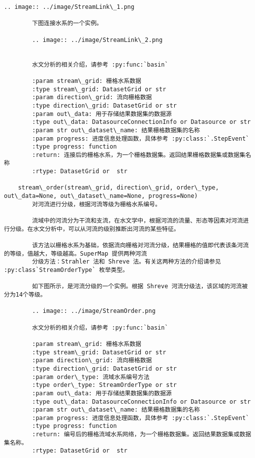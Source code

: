 \documentclass[11pt]{article}
\begin{document}
\begin{Verbatim}[commandchars=\\\{\}]
        .. image:: ../image/StreamLink\_1.png
        
        下图连接水系的一个实例。
        
        .. image:: ../image/StreamLink\_2.png
        
        
        水文分析的相关介绍，请参考 :py:func:`basin`
        
        :param stream\_grid: 栅格水系数据
        :type stream\_grid: DatasetGrid or str
        :param direction\_grid: 流向栅格数据
        :type direction\_grid: DatasetGrid or str
        :param out\_data: 用于存储结果数据集的数据源
        :type out\_data: DatasourceConnectionInfo or Datasource or str
        :param str out\_dataset\_name: 结果栅格数据集的名称
        :param progress: 进度信息处理函数，具体参考 :py:class:`.StepEvent`
        :type progress: function
        :return: 连接后的栅格水系，为一个栅格数据集。返回结果栅格数据集或数据集名称
        :rtype: DatasetGrid or  str
    
    stream\_order(stream\_grid, direction\_grid, order\_type, out\_data=None, out\_dataset\_name=None, progress=None)
        对河流进行分级，根据河流等级为栅格水系编号。
        
        流域中的河流分为干流和支流，在水文学中，根据河流的流量、形态等因素对河流进行分级。在水文分析中，可以从河流的级别推断出河流的某些特征。
        
        该方法以栅格水系为基础，依据流向栅格对河流分级，结果栅格的值即代表该条河流的等级，值越大，等级越高。SuperMap 提供两种河流
        分级方法：Strahler 法和 Shreve 法。有关这两种方法的介绍请参见 :py:class`StreamOrderType` 枚举类型。
        
        如下图所示，是河流分级的一个实例。根据 Shreve 河流分级法，该区域的河流被分为14个等级。
        
        .. image:: ../image/StreamOrder.png
        
        水文分析的相关介绍，请参考 :py:func:`basin`
        
        :param stream\_grid: 栅格水系数据
        :type stream\_grid: DatasetGrid or str
        :param direction\_grid: 流向栅格数据
        :type direction\_grid: DatasetGrid or str
        :param order\_type: 流域水系编号方法
        :type order\_type: StreamOrderType or str
        :param out\_data: 用于存储结果数据集的数据源
        :type out\_data: DatasourceConnectionInfo or Datasource or str
        :param str out\_dataset\_name: 结果栅格数据集的名称
        :param progress: 进度信息处理函数，具体参考 :py:class:`.StepEvent`
        :type progress: function
        :return: 编号后的栅格流域水系网络，为一个栅格数据集。返回结果数据集或数据集名称。
        :rtype: DatasetGrid or  str
    

\end{Verbatim}
\end{document}
